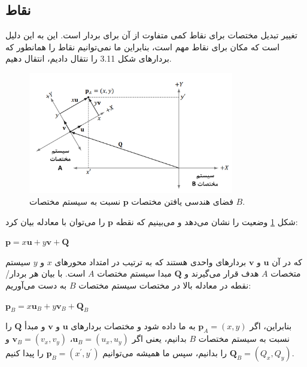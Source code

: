 \subsection{\textbf{نقاط}}
\label{subsec:3.4.2}
{
    \Large
    \begin{spacing}{1.5}
        تغییر تبدیل مختصات برای نقاط کمی متفاوت از آن برای بردار است.
        این به این دلیل است که مکان برای نقاط مهم است، بنابراین ما نمی‌توانیم نقاط را همانطور که بردارهای شکل 3.11 را نتقال دادیم، انتقال دهیم.

        \begin{figure}[H]
            \centering
            \setlength{\belowcaptionskip}{-10pt}
            \includegraphics[width=0.8\textwidth]{Images/4/3/4.Session.1.3.12}
            \caption {فضای هندسی یافتن مختصات $\textbf{p}$ نسبت به سیستم مختصات $B$.}
            \label{fig:4.Session.1.3.12}
        \end{figure}

        شکل \ref{fig:4.Session.1.3.12} وضعیت را نشان می‌دهد و می‌بینیم که نقطه $\textbf{p}$ را می‌توان با معادله بیان کرد:

        \begin{center}
            $\textbf{p}=x\textbf{u}+y\textbf{v}+\textbf{Q}$
        \end{center}

        که در آن $\textbf{u}$ و $\textbf{v}$ بردارهای واحدی هستند که به ترتیب در امتداد محورهای $x$ و $y$ سیستم متخصات $A$ هدف قرار می‌گیرند و $\textbf{Q}$ مبدا سیستم مختصات $A$ است.
        با بیان هر بردار/نقطه در معادله بالا در مختصات سیستم مختصات $B$ به دست می‌آوریم:

        \begin{center}
            $\textbf{p}_{B}=x\textbf{u}_{B}+y\textbf{v}_{B}+\textbf{Q}_{B}$
        \end{center}

        بنابراین، اگر $\textbf{p}_{A}=(x, y)$ به ما داده شود و مختصات بردارهای $\textbf{u}$ و $\textbf{v}$ و مبدأ $\textbf{Q}$ را نسبت به سیستم مختصات $B$ بدانیم، یعنی اگر $\textbf{u}_{B}=(u_{x}, u_{y})$، $\textbf{v}_{B}=(v_{x}, v_{y})$ و $\textbf{Q}_{B}=(Q_{x}, Q_{y})$ را بدانیم، سپس ما همیشه می‌توانیم $\textbf{p}_{B}=(x^\prime, y^\prime)$ را پیدا کنیم.


\end{spacing}}
